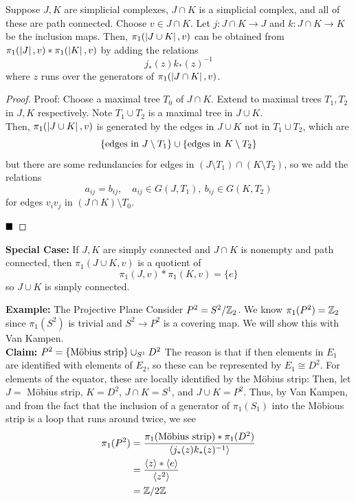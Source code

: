 \begin{theorem}
    Suppose $J, K$ are simplicial complexes, $J \cap K$ is a simplicial complex, and all of these are path connected. Choose $v \in J \cap K$. Let $j : J \cap K \to J$ and $k : J \cap K \to K$ be the inclusion maps. Then, $\pi_1(\abs{J \cup K}, v)$ can be obtained from $\pi_1(\abs{J}, v) * \pi_1(\abs{K}, v)$ by adding the relations
    \[ j_{*}(z)k_{*}(z)^{-1} \]
    where $z$ runs over the generators of $\pi_1(\abs{J \cap K}, v)$.
\end{theorem}
\begin{proof}{Proof:}
    Choose a maximal tree $T_0$ of $J \cap K$. Extend to maximal trees $T_1, T_2$ in $J, K$ respectively. Note $T_1 \cup T_2$ is a maximal tree in $J \cup K$.\\

    Then, $\pi_1(\abs{J \cup K}, v)$ is generated by the edges in $J \cup K$ not in $T_1 \cup T_2$, which are
    \[ \{\tt{edges in } J \setminus T_1\} \cup \{\tt{edges in } K \setminus T_2\} \]
    but there are some redundancies for edges in $(J \setminus T_1) \cap (K \setminus T_2)$, so we add the relations
    \[ a_{ij} = b_{ij}, \quad a_{ij} \in G(J, T_1),\ b_{ij} \in G(K, T_2) \]
    for edges $v_i v_j$ in $(J \cap K) \setminus T_0$.

    $\qed$
\end{proof}

\textbf{Special Case:} If $J, K$ are simply connected and $J \cap K$ is nonempty and path connected, then $\pi_1(J \cup K, v)$ is a quotient of
\[ \pi_1(J, v) * \pi_1(K, v) = \{e\} \]
so $J \cup K$ is simply connected.

\begin{example}{\textbf{Example:} The Projective Plane}
    Consider $P^2 = S^2/\Z_2$. We know $\pi_1(P^2) = \Z_2$ since $\pi_1(S^2)$ is trivial and $S^2 \to P^2$ is a covering map. We will show this with Van Kampen.\\

    \textbf{Claim:} $P^2 = \{\tt{M\"obius strip}\} \cup_{S^1} D^2$
    The reason is that if
    then elements in $E_1$ are identified with elements of $E_2$, so these can be represented by $E_1 \cong D^2$. For elements of the equator, these are locally identified by the M\"obius strip:
    Then, let $J = $ M\"obius strip, $K = D^2$, $J \cap K = S^1$, and $J \cup K = P^2$. Thus, by Van Kampen, and from the fact that the inclusion of a generator of $\pi_1(S_1)$ into the M\"obious strip is a loop that runs around twice, we see
    \begin{align*}
        \pi_1(P^2) &= \frac{\pi_1(\tt{M\"obius strip}) * \pi_1(D^2)}{\brac{j_{*}(z)k_{*}(z)^{-1}}}\\
        &= \frac{\brac{z} * \brac{e}}{\brac{z^2}}\\
        &= \Z/2\Z
    \end{align*}
\end{example}


